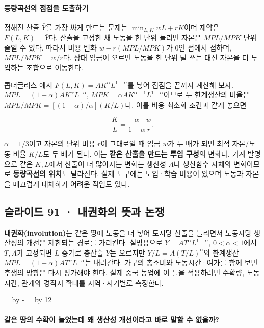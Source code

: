 \documentclass[10pt,a4paper]{article}
\newcommand{\ReserveQuestionSpace}{%
  \par\begingroup
  \dimen0=\pagegoal \advance\dimen0 by -\pagetotal
  \dimen2=\baselineskip \multiply\dimen2 by 12
  \ifdim\dimen0<\dimen2 \newpage\fi
  \endgroup}
\begin{document}
\paragraph{등량곡선의 접점을 도출하기}

정해진 산출 $\bar Y$를 가장 싸게 만드는 문제는 $\min_{L,K} wL+rK$이며 제약은 $F(L,K)=\bar Y$다. 산출을 고정한 채 노동을 한 단위 늘리면 자본은 $MPL/MPK$ 단위 줄일 수 있다. 따라서 비용 변화 $w-r(MPL/MPK)$가 0인 점에서 접하며, $MPL/MPK=w/r$다. 상대 임금이 오르면 노동을 한 단위 덜 쓰는 대신 자본을 더 투입하는 조합으로 이동한다.\par

콥더글러스 예시 $F(L,K)=AK^\alpha L^{1-\alpha}$를 넣어 접점을 끝까지 계산해 보자. $MPL=(1-\alpha)AK^\alpha L^{-\alpha}$, $MPK=\alpha AK^{\alpha-1}L^{1-\alpha}$이므로 두 한계생산의 비율은 $MPL/MPK=[(1-\alpha)/\alpha](K/L)$다. 이를 비용 최소화 조건과 같게 놓으면\par

\[
\frac{K}{L}=\frac{\alpha}{1-\alpha}\frac{w}{r}.
\]

$\alpha=1/3$이고 자본의 단위 비용 $r$이 그대로일 때 임금 $w$가 두 배가 되면 최적 자본/노동 비율 $K/L$도 두 배가 된다. 이는 \textbf{같은 산출을 만드는 투입 구성}의 변화다. 기계 발명으로 같은 $K,L$에서 산출이 더 많아지는 변화는 생산성 $A$나 생산함수 자체의 변화이므로 \textbf{등량곡선의 위치}도 달라진다. 실제 도구에는 도입·학습 비용이 있으며 노동과 자본을 매끄럽게 대체하기 어려운 작업도 있다.\par

\subsection{슬라이드 91 · 내권화의 뜻과 논쟁}
\textbf{내권화(involution)}는 같은 땅에 노동을 더 넣어 토지당 산출을 늘리면서 노동자당 생산성의 개선은 제한되는 경로를 가리킨다. 설명용으로 $Y=A T^\alpha L^{1-\alpha}$, $0<\alpha<1$에서 $T,A$가 고정되면 $L$ 증가로 총산출 $Y$는 오르지만 $Y/L=A(T/L)^\alpha$와 한계생산 $MPL=(1-\alpha)AT^\alpha L^{-\alpha}$는 내려간다. 가구의 총소비와 노동시간·여가를 함께 보면 후생의 방향은 다시 평가해야 한다. 실제 중국 농업에 이 틀을 적용하려면 수확량, 노동시간, 관개와 경작지 확대를 지역·시기별로 측정한다.\par

\ReserveQuestionSpace
\paragraph{같은 땅의 수확이 늘었는데 왜 생산성 개선이라고 바로 말할 수 없을까?}
\end{document}
